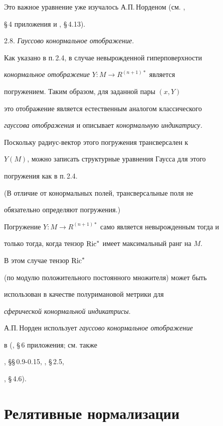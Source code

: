 Это важное уравнение уже изучалось А.П.\,Норденом (см. \cite{SCHI},


\S\,4 приложения и \cite{SIM-S-V}, \S\,4.13).


\medskip





2.8. {\it Гауссово конормальное отображение.}


Как указано в п.\,2.4, в случае невырожденной гиперповерхности


{\it конормальное отображение} $Y: M \to R^{(n+1)*}$ является


погружением. Таким образом, для заданной пары $(x,Y)$


это отображение является естественным аналогом классического


{\it гауссова отображения} и описывает {\it конормальную индикатрису.}


Поскольку радиус-вектор этого погружения трансверсален к


$Y(M)$, можно записать структурные уравнения Гаусса для этого


погружения как в п.\,2.4.


(В отличие от конормальных полей, трансверсальные поля не


обязательно определяют погружения.)


Погружение $Y: M \to R^{(n+1)*}$ само является невырожденным тогда и


только тогда, когда тензор $\operatorname{Ric}^*$ имеет максимальный ранг на $M$.


В этом случае тензор $\operatorname{Ric}^*$


(по модулю положительного постоянного множителя) может быть


использован в качестве полуримановой метрики для


{\it сферической конормальной индикатрисы}.


А.П.\,Норден использует {\it гауссово конормальное отображение}


в (\cite{SCHI}, \S\,6 приложения; см. также 


\cite{LI-S-Z-1}, \S\S\,0.9-0.15, \cite{NOM-SA}, \S\,2.5, 


\cite{SIM-S-V}, \S\,4.6).








\section{Релятивные нормализации}






